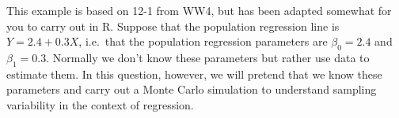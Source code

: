 \documentclass[addpoints,12pt]{exam}\usepackage[]{graphicx}\usepackage[]{color}
\makeatletter
\newcommand{\hlnum}[1]{\textcolor[rgb]{0.686,0.059,0.569}{#1}}%
\newcommand{\hlopt}[1]{\textcolor[rgb]{0,0,0}{#1}}%
\newcommand{\hlstd}[1]{\textcolor[rgb]{0.345,0.345,0.345}{#1}}%
\newcommand{\hlkwa}[1]{\textcolor[rgb]{0.161,0.373,0.58}{\textbf{#1}}}%
\newcommand{\hlkwb}[1]{\textcolor[rgb]{0.69,0.353,0.396}{#1}}%
\newcommand{\hlkwc}[1]{\textcolor[rgb]{0.333,0.667,0.333}{#1}}%
\newcommand{\hlkwd}[1]{\textcolor[rgb]{0.737,0.353,0.396}{\textbf{#1}}}%
\newenvironment{kframe}{%
 \def\at@end@of@kframe{}%
 \ifinner\ifhmode%
  \def\at@end@of@kframe{\end{minipage}}%
  \begin{minipage}{\columnwidth}%
 \fi\fi%
 \def\FrameCommand##1{\hskip\@totalleftmargin \hskip-\fboxsep
 \colorbox{shadecolor}{##1}\hskip-\fboxsep
     \hskip-\linewidth \hskip-\@totalleftmargin \hskip\columnwidth}%
 \MakeFramed {\advance\hsize-\width
   \@totalleftmargin\z@ \linewidth\hsize
   \@setminipage}}%
 {\par\unskip\endMakeFramed%
 \at@end@of@kframe}
\newenvironment{knitrout}{}{} %
\makeatother
\begin{document}
\begin{questions}
	\question This example is based on 12-1 from WW4, but has been adapted somewhat for you to carry out in R. Suppose that the population regression line is $Y = 2.4 + 0.3 X$, i.e.\ that the population regression parameters are $\beta_0 = 2.4$ and $\beta_1 = 0.3$. Normally we don't know these parameters but rather use data to estimate them. In this question, however, we will pretend that we know these parameters and carry out a Monte Carlo simulation to understand sampling variability in the context of regression.
\end{questions}
\end{document}

